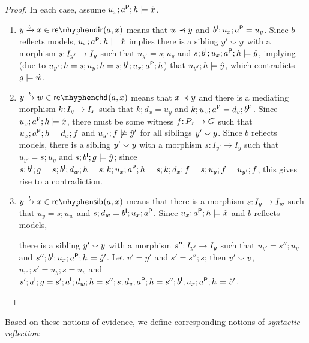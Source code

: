 \begin{proof}
In each case, assume $u_x;a\P;h\sat \hat x$.
\begin{enumerate}
\item $\trip ybx\in \redir{a,x}$ means that $w\parentof y$ and $b\I;u_x;a\P=u_y$. Since $b$ reflects models, $u_x;a\P;h\sat \hat x$ implies there is a sibling $y'\sibling y$ with a morphism $s\of I_{y'}\to I_y$ such that $u_{y'}=s;u_y$ and $s;b\I;u_x;a\P;h\sat \hat y$, implying (due to $u_{y'};h=s;u_y;h=s;b\I;u_x;a\P;h$) that $u_{y'};h\sat \hat y$, which contradicts $g\sat \hat w$.

\item $\trip ybw\in \rechd{a,x}$ means that $x\parentof y$ and there is a mediating morphism $k\of I_y\to I_x$ such that $k;d_x=u_y$ and $k;u_x;a\P=d_y;b\P$. Since $u_x;a\P;h\sat \hat x$, there must be some witness $f\of P_x\to G$ such that $u_x;a\P;h=d_x;f$ and $u_{y'};f\nsat \hat y'$ for all siblings $y'\sibling y$. Since $b$ reflects models, there is a sibling $y'\sibling y$ with a morphism $s:I_{y'}\to I_y$ such that $u_{y'}=s;u_y$ and $s;b\I;g\sat \hat y$; since $s;b\I;g= s;b\I;d_w;h= s;k;u_x;a\P;h=s;k;d_x;f=s;u_y;f=u_{y'};f$, this gives rise to a contradiction.

\item $\trip ybx\in \resib{a,x}$ means that there is a morphism $s\of I_y\to I_w$ such that $u_y=s;u_w$ and $s;d_w=b\I;u_x;a\P$. Since $u_x;a\P;h\sat \hat x$ and $b$ reflects models, 

there is a sibling $y'\sibling y$ with a morphism $s''\of I_{y'}\to I_y$ such that $u_{y'}=s'';u_y$ and $s'';b\I;u_x;a\P;h\sat \hat y'$. Let $v'=y'$ and $s'=s'';s$; then $v'\sibling v$, $u_{v'};s'=u_y;s=u_v$ and $s';a\I;g= s';a\I;d_w;h= s'';s;d_v;a\P;h= s'';b\I;u_x;a\P;h \sat \hat v'$.
\end{enumerate}
\end{proof}
%
Based on these notions of evidence, we define corresponding notions of \emph{syntactic reflection}:

